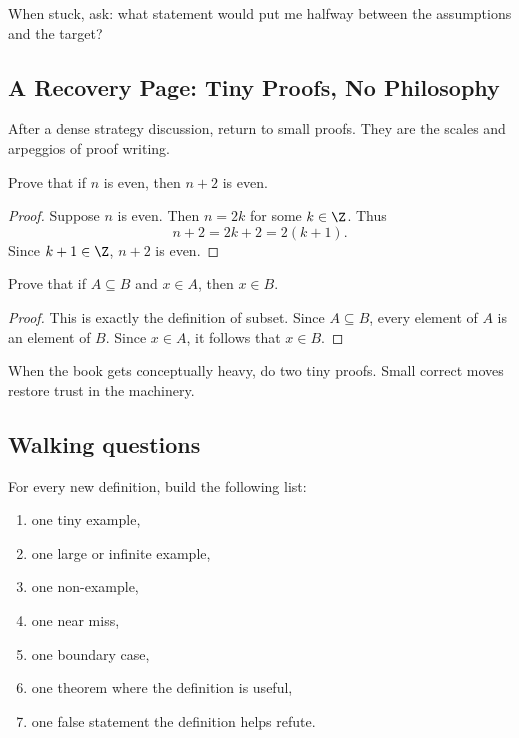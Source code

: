 \begin{focusbox}
When stuck, ask: what statement would put me halfway between the assumptions
and the target?
\end{focusbox}

\subsection{A Recovery Page: Tiny Proofs, No Philosophy}

After a dense strategy discussion, return to small proofs. They are the scales
and arpeggios of proof writing.

\begin{exercise}
Prove that if $n$ is even, then $n+2$ is even.
\end{exercise}

\begin{proof}
Suppose $n$ is even. Then $n=2k$ for some $k\in\Z$. Thus
\[
n+2=2k+2=2(k+1).
\]
Since $k+1\in\Z$, $n+2$ is even.
\end{proof}

\begin{exercise}
Prove that if $A\subseteq B$ and $x\in A$, then $x\in B$.
\end{exercise}

\begin{proof}
This is exactly the definition of subset. Since $A\subseteq B$, every element
of $A$ is an element of $B$. Since $x\in A$, it follows that $x\in B$.
\end{proof}

\begin{recoverybox}
When the book gets conceptually heavy, do two tiny proofs. Small correct moves
restore trust in the machinery.
\end{recoverybox}

\subsection{Walking questions}

\begin{walkbox}
For every new definition, build the following list:

\begin{enumerate}
\item one tiny example,
\item one large or infinite example,
\item one non-example,
\item one near miss,
\item one boundary case,
\item one theorem where the definition is useful,
\item one false statement the definition helps refute.
\end{enumerate}
\end{walkbox}


